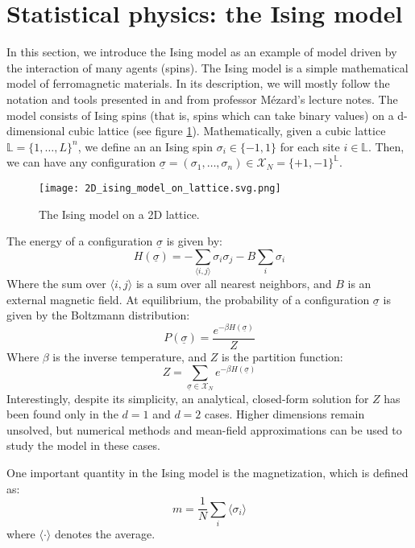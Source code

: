 \section{Statistical physics: the Ising model}
In this section, we introduce the Ising model as an example of model driven by the interaction of many agents (spins). The Ising model is a simple mathematical model of ferromagnetic materials. In its description, we will mostly follow the notation and tools presented in \cite{mezard_book} and from professor Mézard's lecture notes. The model consists of Ising spins (that is, spins which can take binary values) on a d-dimensional cubic lattice (see figure \ref{fig:ising_model}). Mathematically, given a cubic lattice $\mathbb{L}=\{1,\dots,L\}^n$, we define an an Ising spin $\sigma_i\in\{-1,1\}$ for each site $i\in\mathbb{L}$. Then, we can have any configuration $\underline{\sigma} = (\sigma_1,\dots,\sigma_n) \in \mathcal{X}_N=\{+1,-1\}^{\mathbb{L}}$.

\begin{figure}[h]
    \centering
    \texttt{[image: 2D\_ising\_model\_on\_lattice.svg.png]}
    \caption{The Ising model on a 2D lattice.}
    \label{fig:ising_model}
\end{figure}


The energy of a configuration $\underline{\sigma}$ is given by:
\begin{equation}
    H(\underline{\sigma}) = -\sum_{\langle i,j\rangle}\sigma_i\sigma_j - B\sum_i \sigma_i
\end{equation}
Where the sum over $\langle i,j\rangle$ is a sum over all nearest neighbors, and $B$ is an external magnetic field. At equilibrium, the probability of a configuration $\underline{\sigma}$ is given by the Boltzmann distribution:
\begin{equation}
    P(\underline{\sigma}) = \frac{e^{-\beta H(\underline{\sigma})}}{Z}
\end{equation}
Where $\beta$ is the inverse temperature, and $Z$ is the partition function:
\begin{equation}
    Z = \sum_{\underline{\sigma}\in\mathcal{X}_N}e^{-\beta H(\underline{\sigma})}
\end{equation}
Interestingly, despite its simplicity, an analytical, closed-form solution for \(Z\) has been found only in the $d=1$ and $d=2$ cases. Higher dimensions remain unsolved, but numerical methods and mean-field approximations can be used to study the model in these cases.

One important quantity in the Ising model is the magnetization, which is defined as:
\begin{equation}
    m = \frac{1}{N}\sum_i \langle \sigma_i \rangle
\end{equation}
where $\langle \cdot \rangle$ denotes the average.


